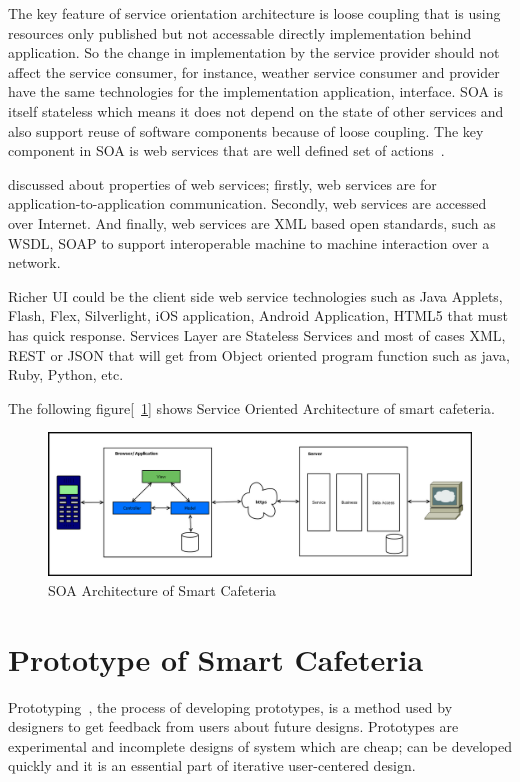 The key feature of service orientation architecture is loose coupling that is
using resources only published but not accessable directly implementation behind
application. So the change in implementation by the service provider should not
affect the service consumer, for instance, weather service consumer and provider
have the same technologies for the implementation application, interface. SOA is
itself stateless which means it does not depend on the state of other services
and also support reuse of software components because of loose coupling. The key
component in SOA is web services that are well defined set of
actions~\cite{Linthicum2004,Sahin2008}.

\citet{Akinci2004} discussed about properties of web services; firstly,
web services are for application-to-application communication. Secondly, web
services are accessed over Internet. And finally, web services are XML based
open standards, such as WSDL, SOAP to support interoperable machine to machine
interaction over a network.

Richer UI could be the client side web service technologies such as Java
Applets, Flash, Flex, Silverlight, iOS application, Android Application, HTML5
that must has quick response. Services Layer are  Stateless Services and most of
cases XML, REST or JSON that will get from Object oriented program function such
as java, Ruby, Python, etc.

The following figure[~\ref{SOAArchitecture}] shows Service Oriented Architecture
of smart cafeteria.

\begin{figure}[h!t]
    \centering
      \includegraphics[width=5.5in]{ch4/SOA/SOAArchitecture}
  \caption{SOA Architecture of Smart Cafeteria}
  \label{SOAArchitecture}
\end{figure}


\section{Prototype of Smart Cafeteria}
\label{sec:PrototypeSC}
Prototyping~\cite{Mads2010,Greenberg}, the process of developing prototypes, is
a method used by designers to get feedback from users about future designs.
Prototypes are experimental and incomplete designs of system which are cheap;
can be developed quickly and it is an essential part of iterative user-centered
design.

